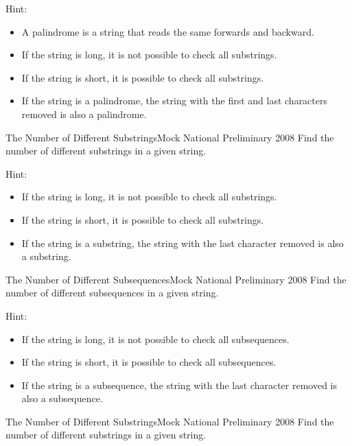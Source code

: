 Hint:
\begin{itemize}
\item A palindrome is a string that reads the same forwards and backward.
\item If the string is long, it is not possible to check all substrings.
\item If the string is short, it is possible to check all substrings.
\item If the string is a palindrome, the string with the first and last characters removed is also a palindrome.
\end{itemize}

\begin{pbox}{The Number of Different Substrings}{Mock National Preliminary 2008}
Find the number of different substrings in a given string.

\end{pbox}

Hint:
\begin{itemize}
\item If the string is long, it is not possible to check all substrings.
\item If the string is short, it is possible to check all substrings.
\item If the string is a substring, the string with the last character removed is also a substring.
\end{itemize}

\begin{pbox}{The Number of Different Subsequences}{Mock National Preliminary 2008}
Find the number of different subsequences in a given string.

\end{pbox}

Hint:
\begin{itemize}
\item If the string is long, it is not possible to check all subsequences.
\item If the string is short, it is possible to check all subsequences.
\item If the string is a subsequence, the string with the last character removed is also a subsequence.
\end{itemize}

\begin{pbox}{The Number of Different Substrings}{Mock National Preliminary 2008}
Find the number of different substrings in a given string.

\end{pbox}

